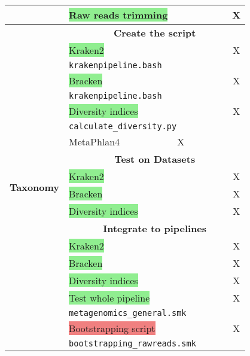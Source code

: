 \documentclass[11pt]{report}
\newcommand{\highlightessential}[1]{\colorbox{lightgreen}{#1}}
\newcommand{\highlightoptional}[1]{\colorbox{lightorange}{#1}}
\newcommand{\highlightrobust}[1]{\colorbox{lightcoral}{#1}}
\begin{document}
\begin{longtable}{|c|p{8cm}|c|c|c|c|c|c|}
	& \highlightessential{Raw reads trimming} & & & & & & X \\ 
	
	\hline
	
	
	\multirow{20}{*}{\textbf{Taxonomy}} 
	& \multicolumn{7}{c|}{\textbf{Create the script}} \\
	& \highlightessential{Kraken2} & & & & & & X \\
	& \multicolumn{7}{l}{\texttt{krakenpipeline.bash}} \\ 
	& \highlightessential{Bracken} & & & & & & X \\
	& \multicolumn{7}{l}{\texttt{krakenpipeline.bash}} \\ 
	& \highlightessential{Diversity indices} & & & & & & X \\
	& \multicolumn{7}{l}{\texttt{calculate\_diversity.py}} \\ 
	& \highlightoptional{MetaPhlan4} & X & & & & & \\ 
	& \multicolumn{7}{c|}{\textbf{Test on Datasets}} \\
	& \highlightessential{Kraken2} & & & & & & X \\
	& \highlightessential{Bracken} & & & & & & X \\
	& \highlightessential{Diversity indices} & & & & & & X \\
	& \multicolumn{7}{c|}{\textbf{Integrate to pipelines}} \\
	& \highlightessential{Kraken2} & & & & & & X \\
	& \highlightessential{Bracken} & & & & & & X \\
	& \highlightessential{Diversity indices} & & & & & & X \\
	& \highlightessential{Test whole pipeline} & & & & & & X \\
	& \multicolumn{7}{l}{\texttt{metagenomics\_general.smk}} \\ 
	& \highlightrobust{Bootstrapping script} & & & & & & X \\
	& \multicolumn{7}{l}{\texttt{bootstrapping\_rawreads.smk}} \\ 
	
	\hline
	

\end{longtable}
\end{document}
